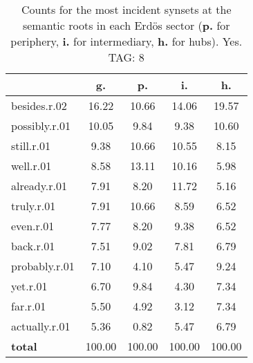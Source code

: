 \begin{table}[h!]
\begin{center}
\begin{tabular}{| l || c | c | c | c |}\hline
 & {\bf g.} & {\bf p.} & {\bf i.} & {\bf h.} \\\hline\hline
besides.r.02 & 16.22  & 10.66  & 14.06  & 19.57 \\\hline
possibly.r.01 & 10.05  & 9.84  & 9.38  & 10.60 \\\hline
still.r.01 & 9.38  & 10.66  & 10.55  & 8.15 \\\hline
well.r.01 & 8.58  & 13.11  & 10.16  & 5.98 \\\hline
already.r.01 & 7.91  & 8.20  & 11.72  & 5.16 \\\hline
truly.r.01 & 7.91  & 10.66  & 8.59  & 6.52 \\\hline
even.r.01 & 7.77  & 8.20  & 9.38  & 6.52 \\\hline
back.r.01 & 7.51  & 9.02  & 7.81  & 6.79 \\\hline
probably.r.01 & 7.10  & 4.10  & 5.47  & 9.24 \\\hline
yet.r.01 & 6.70  & 9.84  & 4.30  & 7.34 \\\hline
far.r.01 & 5.50  & 4.92  & 3.12  & 7.34 \\\hline
actually.r.01 & 5.36  & 0.82  & 5.47  & 6.79 \\\hline\hline
{{\bf total}} & 100.00  & 100.00  & 100.00  & 100.00 \\\hline
\end{tabular}
\caption{Counts for the most incident synsets at the semantic roots in each Erd\"os sector ({\bf p.} for periphery, {\bf i.} for intermediary, {\bf h.} for hubs). Yes. TAG: 8}
\end{center}
\end{table}
